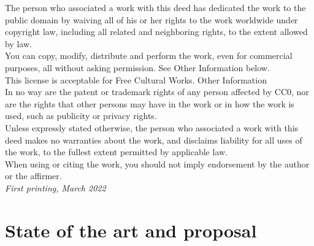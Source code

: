 \documentclass[
	12pt, %
	fleqn, %
	a4paper, %
	oneside, %
]{LegrandOrangeBook}
\begin{document}
\noindent The person who associated a work with this deed has dedicated the work to the public domain by waiving all of his or her rights to the work worldwide under copyright law, including all related and neighboring rights, to the extent allowed by law.\\
You can copy, modify, distribute and perform the work, even for commercial purposes, all without asking permission. See Other Information below.\\
This license is acceptable for Free Cultural Works.
Other Information\\
In no way are the patent or trademark rights of any person affected by CC0, nor are the rights that other persons may have in the work or in how the work is used, such as publicity or privacy rights.\\
Unless expressly stated otherwise, the person who associated a work with this deed makes no warranties about the work, and disclaims liability for all uses of the work, to the fullest extent permitted by applicable law.\\
When using or citing the work, you should not imply endorsement by the author or the affirmer.\\

\noindent \textit{First printing, March 2022} %


\pagestyle{empty} %

\tableofcontents %

\listoffigures %

\listoftables %

\pagestyle{fancy} %

\cleardoublepage %


\part{State of the art and proposal}
\end{document}

